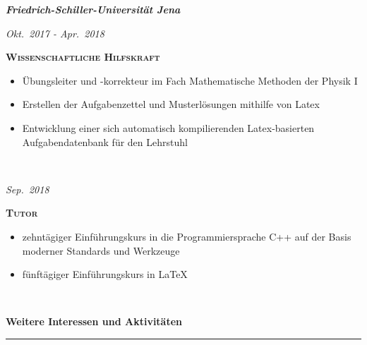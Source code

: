 \documentclass[8pt]{article}
\newcommand{\cvSectionStyle}{%
  \normalfont%
  \Large%
  \color{cvColor}%
  \bfseries%
  \sffamily%
}
\newcommand{\cvSubsectionStyle}{%
  \normalfont%
  \sffamily%
  \itshape%
  \bfseries%
}
\newcommand{\cvSection}[1]{%
  \smallskip%
  {%
    \cvSectionStyle #1%
  }\\[-0.5em]
  \rule{\linewidth}{0.8pt}%
  \par%
  \smallskip%
}
\newcommand{\cvSubsection}[1]{%
  \begin{tcolorbox}[left=0pt, top=0pt, bottom=0pt, right=0pt, boxsep=5pt, arc=5pt, frame code={}, colback=cvBackgroundColor]
    \cvSubsectionStyle #1%
  \end{tcolorbox}
}
\newenvironment{cvEducationItem}[2]{
  \par
  \begin{minipage}[c]{0.15\linewidth}
    \raggedleft
    \footnotesize
    \textit{#1}
  \end{minipage}
  \quad
  \vrule
  \quad
  \begin{minipage}[t]{0.7\linewidth}
    \textsc{\color{cvColor} \textbf{#2}}
    \footnotesize
    \begin{itemize}[itemsep=0mm, leftmargin=3mm]
}{
    \end{itemize}
  \end{minipage}
  \\[0.5em]
}
\begin{document}
  \cvSubsection{Friedrich-Schiller-Universität Jena}
  \begin{cvEducationItem}{Okt.~2017 - Apr.~2018}{Wissenschaftliche Hilfskraft}
    \item Übungsleiter und -korrekteur im Fach Mathematische Methoden der Physik I
    \item Erstellen der Aufgabenzettel und Musterlösungen mithilfe von Latex
    \item Entwicklung einer sich automatisch kompilierenden Latex-basierten Aufgabendatenbank für den Lehrstuhl
  \end{cvEducationItem}
  \begin{cvEducationItem}{Sep.~2018}{Tutor}
    \item zehntägiger Einführungskurs in die Programmiersprache C++ auf der Basis moderner Standards und Werkzeuge
    \item fünftägiger Einführungskurs in LaTeX
  \end{cvEducationItem}

  \cvSection{Weitere Interessen und Aktivitäten}
\end{document}
